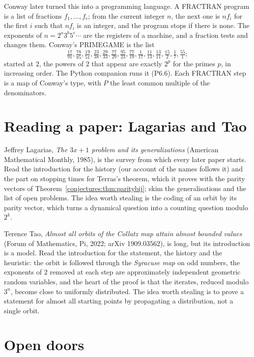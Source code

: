 \begin{remark}[FRACTRAN]\label{conjectures:rem:fractran}
Conway later turned this into a programming language. A FRACTRAN program is a list of fractions $f_1,\dots,f_r$; from the current integer $n$, the next
one is $nf_i$ for the first $i$ such that $nf_i$ is an integer, and the program stops if there is none. The exponents of $n=2^a3^b5^c\cdots$ are the
registers of a machine, and a fraction tests and changes them. Conway's PRIMEGAME is the list
\[
\tfrac{17}{91},\tfrac{78}{85},\tfrac{19}{51},\tfrac{23}{38},\tfrac{29}{33},\tfrac{77}{29},\tfrac{95}{23},\tfrac{77}{19},\tfrac1{17},\tfrac{11}{13},\tfrac{13}{11},\tfrac{15}2,\tfrac17,\tfrac{55}1;
\]
started at $2$, the powers of $2$ that appear are exactly $2^p$ for the primes $p$, in increasing order. The Python companion runs it (P6.6). Each
FRACTRAN step is a map of Conway's type, with $P$ the least common multiple of the denominators.
\end{remark}

\section{Reading a paper: Lagarias and Tao}

Jeffrey Lagarias, \emph{The $3x+1$ problem and its generalizations} (American Mathematical Monthly, 1985), is the survey from which every later
paper starts. Read the introduction for the history (our account of the names follows it) and the part on stopping times for Terras's theorem, which it
proves with the parity vectors of Theorem~\ref{conjectures:thm:paritybij}; skim the generalisations and the list of open problems. The idea worth stealing is the coding of an orbit by
its parity vector, which turns a dynamical question into a counting question modulo $2^k$.

Terence Tao, \emph{Almost all orbits of the Collatz map attain almost bounded values} (Forum of Mathematics, Pi, 2022; arXiv 1909.03562), is long, but
its introduction is a model. Read the introduction for the statement, the history and the heuristic: the orbit is followed through the
\emph{Syracuse map} on odd numbers, the exponents of $2$ removed at each step are approximately independent geometric random variables, and the heart
of the proof is that the iterates, reduced modulo $3^n$, become close to uniformly distributed. The idea worth stealing is to prove a statement for
almost all starting points by propagating a distribution, not a single orbit.

\section{Open doors}

